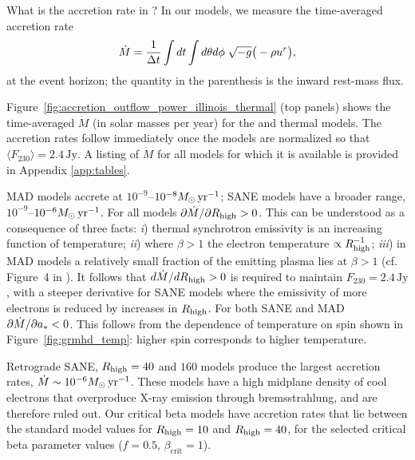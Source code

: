 What is the accretion rate in \sgra?  In our models, we measure the time-averaged accretion rate
\begin{equation}
  \dot{M} = \frac{1}{\Delta t}\int dt\int d\theta d\phi\hspace{0.1cm}\sqrt{-g}\big(-\rho u^{r}\big),
\end{equation}
at the event horizon; the quantity in the parenthesis is the inward rest-mass flux.

Figure~\ref{fig:accretion_outflow_power_illinois_thermal} (top panels) shows the time-averaged $\dot{M}$ (in solar masses per year) for the \kharma and \bhac thermal models.  The accretion rates follow immediately once the models are normalized so that $\langle F_{230}\rangle = 2.4\,\mathrm{Jy}$.  A listing of $\dot{M}$ for all models for which it is available is provided in Appendix \ref{app:tables}.

MAD models accrete at $10^{-9}$--$10^{-8} M_{\odot}\,\mathrm{yr}^{-1}$; SANE models have a broader range, $10^{-9}$--$10^{-6} M_{\odot}\,\mathrm{yr}^{-1}$.  For all models $\partial\dot{M}/\partial R_\mathrm{high} > 0$.  This can be understood as a consequence of three facts: \emph{i}) thermal synchrotron emissivity is an increasing function of temperature; \emph{ii}) where $\beta > 1$ the electron temperature $\propto R_\mathrm{high}^{-1}$; \emph{iii}) in MAD models a relatively small fraction of the emitting plasma lies at $\beta > 1$ (cf. Figure~4 in ).  It follows that $d\dot{M}/dR_\mathrm{high} > 0$ is required to maintain $F_{230} = 2.4\,\mathrm{Jy}$, with a steeper derivative for SANE models where the emissivity of more electrons is reduced by increases in $R_\mathrm{high}$.  For both SANE and MAD $\partial\dot{M}/\partial a_* < 0$.  This follows from the dependence of temperature on spin shown in Figure~\ref{fig:grmhd_temp}: higher spin corresponds to higher temperature.

Retrograde SANE, $R_\mathrm{high}=40$ and $160$ models produce the largest accretion rates, $\dot{M} \sim 10^{-6}M_{\odot}\,\mathrm{yr}^{-1}$.  These models have a high midplane density of cool electrons that overproduce X-ray emission through bremsstrahlung, and are therefore ruled out.   Our critical beta models have accretion rates that lie between the standard model values for $R_\mathrm{high} = 10$ and $R_\mathrm{high} = 40$, for the selected critical beta parameter values ($f=0.5$, $\beta_\mathrm{crit}=1$).

